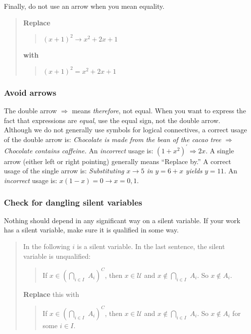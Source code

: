 \documentclass[12pt]{article}
\newcounter{ex}\setcounter{ex}{0}
\newcounter{id}\setcounter{id}{0}
\newcounter{se}\setcounter{se}{0}
\begin{document}
Finally, do not use an arrow when you mean equality.

\begin{quote}
\textbf{Replace}
\begin{quote}
  \( (x+1)^2 \rightarrow x^2 + 2 x + 1 \)
\end{quote}
\textbf{with}
\begin{quote}
   \( (x+1)^2 = x^2 + 2 x + 1 \)
\end{quote}
\end{quote}

 \subsubsection{ Avoid arrows}
The double arrow \(\Rightarrow\) means \emph{therefore}, not
equal. When you want to express the fact that expressions are
\emph{equal}, use the equal sign, not the double arrow. Although we do
not generally use symbols for logical connectives, a correct usage of
the double arrow is: \emph{Chocolate is made from the bean of the
cacao tree \(\Rightarrow\) Chocolate contains caffeine.}  An
\emph{incorrect} usage is: \(\left(1 + x^2\right)^\prime \Rightarrow 2
x\).  A single arrow (either left or right pointing) generally means
``Replace by.''  A correct usage of the single arrow is:
\emph{Substituting \(x \to 5\) in \(y = 6 + x\) yields \(y = 11\).} An
\emph{incorrect} usage is: \(x (1-x) = 0 \to x = 0,1\).



 \subsubsection{ Check for dangling silent variables}

Nothing should depend in any significant way on a  silent variable. If your
work has a  silent variable, make sure it is qualified in some way.


\begin{quote}
In the following \(i\) is a  silent variable. In the last sentence, the
 silent variable is unqualified:
\begin{quote}
If \(x \in \left(\underset{i \in I}{\bigcap} \,\, A_i \right)^C\), then
\(x \in \mathcal{U}\) and \(x \notin \underset{i \in I}{\bigcap} \,\, A_i\).
So \(x \notin A_i\).
\end{quote}
\textbf{Replace} this with
\begin{quote}
If \(x \in \left(\underset{i \in I}{\bigcap} \,\, A_i \right)^C\), then
\(x \in \mathcal{U}\) and \(x \notin \underset{i \in I}{\bigcap} \,\, A_i\).
So \(x \notin A_i\) for some \(i \in I\).
\end{quote}
\end{quote}
\end{document}
